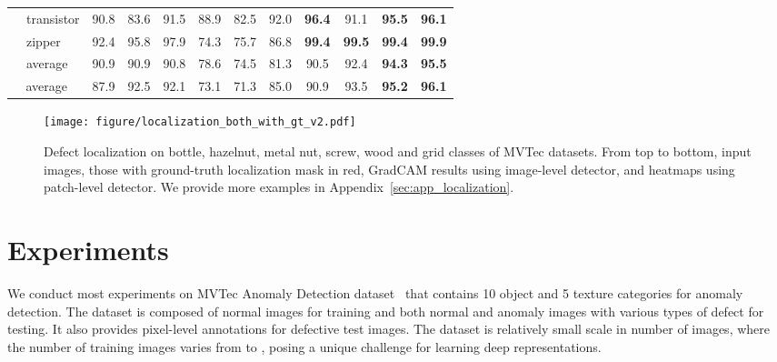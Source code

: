 \documentclass[final]{cvpr}
\begin{document}
\begin{table*}[t]
{\begin{tabular}{l|l|c|c|c||c|c|c|c|c|c|c}
    &   transistor  &   90.8    &   83.6    &   91.5    &   88.9\scriptsize{} &    82.5\scriptsize{} &    92.0\scriptsize{} &    \textbf{96.4}\scriptsize{} &    91.1\scriptsize{} &    \textbf{95.5}\scriptsize{} &    \textbf{\color{red}96.1}    \\
    &   zipper  &   92.4    &   95.8    &   97.9    &   74.3\scriptsize{} &    75.7\scriptsize{} &    86.8\scriptsize{} &    \textbf{99.4}\scriptsize{} &    \textbf{99.5}\scriptsize{} &    \textbf{99.4}\scriptsize{} &    \textbf{\color{red}99.9}    \\ \cmidrule{2-12}
    &   average &   90.9    &   90.9    &   90.8    &   78.6\scriptsize{} &    74.5\scriptsize{} &    81.3\scriptsize{} &    90.5\scriptsize{} &    92.4\scriptsize{} &    \textbf{94.3}\scriptsize{} &    \textbf{\color{red}95.5}    \\ \midrule
        \multicolumn{2}{c|}{average}    &   87.9    &   92.5    &   92.1    &   73.1\scriptsize{} &    71.3\scriptsize{} &    85.0\scriptsize{} &    90.9\scriptsize{} &    93.5\scriptsize{} &    \textbf{95.2}\scriptsize{} &    \textbf{\color{red}96.1}    \\ \bottomrule
    \end{tabular}
    }
    \vspace{-0.1in}
\end{table*}

\begin{figure*}[t]
    \centering
    \texttt{[image: figure/localization\_both\_with\_gt\_v2.pdf]}
\caption{Defect localization on bottle, hazelnut, metal nut, screw, wood and grid classes of MVTec datasets. From top to bottom, input images, those with ground-truth localization mask in red, GradCAM results using image-level detector, and heatmaps using patch-level detector. We provide more examples in Appendix~\ref{sec:app_localization}.}
    \label{fig:localization}
    \vspace{-0.2in}
\end{figure*}


\section{Experiments}
\label{sec:exp}
We conduct most experiments on MVTec Anomaly Detection dataset~\cite{bergmann2019mvtec} that contains 10 object and 5 texture categories for anomaly detection. The dataset is composed of normal images for training and both normal and anomaly images with various types of defect for testing. It also provides pixel-level annotations for defective test images. The dataset is relatively small scale in number of images, where the number of training images varies from  to , posing a unique challenge for learning deep representations.
\end{document}
